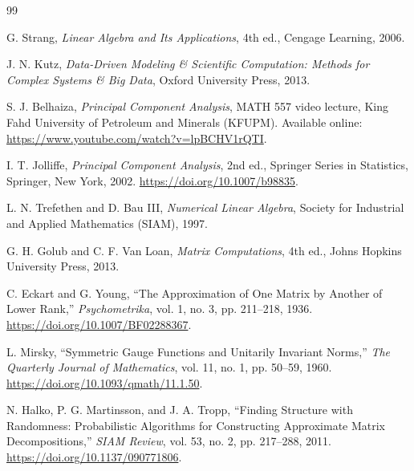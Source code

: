 \documentclass[11pt]{article}
\begin{document}
\begin{thebibliography}{99}

G. Strang,
\textit{Linear Algebra and Its Applications},
4th ed.,
Cengage Learning, 2006.

J. N. Kutz,
\textit{Data-Driven Modeling \& Scientific
Computation: Methods for Complex Systems
\& Big Data},
Oxford University Press, 2013.

S. J. Belhaiza,
\textit{Principal Component Analysis},
MATH 557 video lecture,
King Fahd University of Petroleum
and Minerals (KFUPM).
Available online:
\url{https://www.youtube.com/watch?v=lpBCHV1rQTI}.

I. T. Jolliffe,
\textit{Principal Component Analysis},
2nd ed.,
Springer Series in Statistics,
Springer, New York, 2002.
\url{https://doi.org/10.1007/b98835}.

L. N. Trefethen and D. Bau III,
\textit{Numerical Linear Algebra},
Society for Industrial and
Applied Mathematics (SIAM), 1997.

G. H. Golub and C. F. Van Loan,
\textit{Matrix Computations},
4th ed.,
Johns Hopkins University Press, 2013.

C. Eckart and G. Young,
``The Approximation of One Matrix
by Another of Lower Rank,''
\textit{Psychometrika},
vol. 1, no. 3,
pp. 211--218, 1936.
\url{https://doi.org/10.1007/BF02288367}.

L. Mirsky,
``Symmetric Gauge Functions
and Unitarily Invariant Norms,''
\textit{The Quarterly Journal
of Mathematics},
vol. 11, no. 1,
pp. 50--59, 1960.
\url{https://doi.org/10.1093/qmath/11.1.50}.

N. Halko, P. G. Martinsson,
and J. A. Tropp,
``Finding Structure with Randomness:
Probabilistic Algorithms for Constructing
Approximate Matrix Decompositions,''
\textit{SIAM Review},
vol. 53, no. 2,
pp. 217--288, 2011.
\url{https://doi.org/10.1137/090771806}.

\end{thebibliography}
\end{document}
